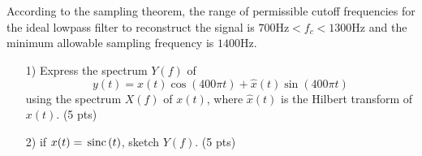 \documentclass{assignment}
\begin{document}
\begin{sol}
\begin{figure}[h]
        \caption{}
        \label{5}
    \end{figure}
    According to the sampling theorem, the range of permissible cutoff frequencies for the ideal lowpass filter to reconstruct the signal is $700\text{Hz}<f_c<1300$Hz and the minimum allowable sampling frequency is $1400$Hz.
\end{sol}

\begin{prob}
    \begin{itemize}
        \item[1)] Express the spectrum $Y(f)$ of
        \[
            y(t)=x(t)\cos(400\pi t)+\hat{x}(t)\sin(400\pi t)
        \]
        using the spectrum $X(f)$ of $x(t)$, where $\hat{x}(t)$ is the Hilbert transform of $x(t)$. (5 pts)
        \item[2)] if $x(t)=\,\text{sinc}\,(t)$, sketch $Y(f)$. (5 pts)
    \end{itemize}
\end{prob}
\end{document}

